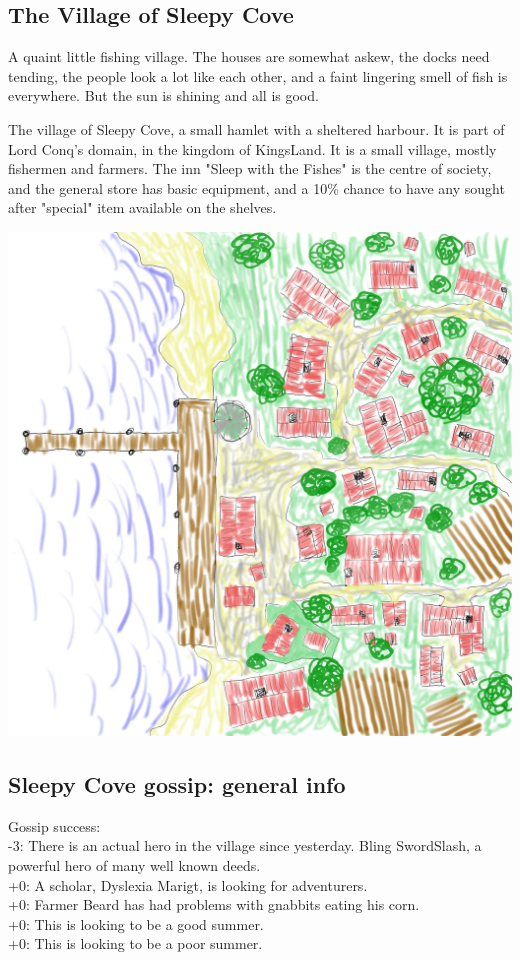 \subsection*{The Village of Sleepy Cove}
\begin{readoutloud}
A quaint little fishing village. The houses are somewhat askew, the docks need tending, the people look a lot like each other, and a faint lingering smell of fish is everywhere. But the sun is shining and all is good.
\end{readoutloud}

The village of Sleepy Cove, a small hamlet with a sheltered harbour. It is part of Lord Conq's domain, in the kingdom of KingsLand. It is a small village, mostly fishermen and farmers. The inn "Sleep with the Fishes" is the centre of society, and the general store has basic equipment, and a 10\% chance to have any sought after "special" item available on the shelves.


\begin{center}
\includegraphics[width=1.0\linewidth]{./maps/Sleepy-Cove-(100x100,16+0+0).jpg}
\end{center}


\subsection*{Sleepy Cove gossip: general info}
Gossip success:\\
-3: There is an actual hero in the village since yesterday. Bling SwordSlash, a powerful hero of many well known deeds.  \\
+0: A scholar, Dyslexia Marigt, is looking for adventurers. \\
+0: Farmer Beard has had problems with gnabbits eating his corn. \\
+0: This is looking to be a good summer. \\
+0: This is looking to be a poor summer. \\



